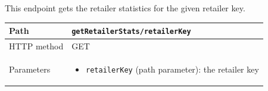 \documentclass[a4paper]{report}
\begin{document}
This endpoint gets the retailer statistics for the given retailer key.

\begin{center}
\begin{tabularx} {\textwidth} { | l | X | }

\hline

Path & \texttt{getRetailerStats/retailerKey} \\

\hline

HTTP method & GET \\

\hline

Parameters & \begin{itemize}[leftmargin=*,noitemsep,topsep=0px]
\item \texttt{retailerKey} (path parameter): the retailer key
\end{itemize} \\

\hline


\end{tabularx}
\end{center}
\end{document}
